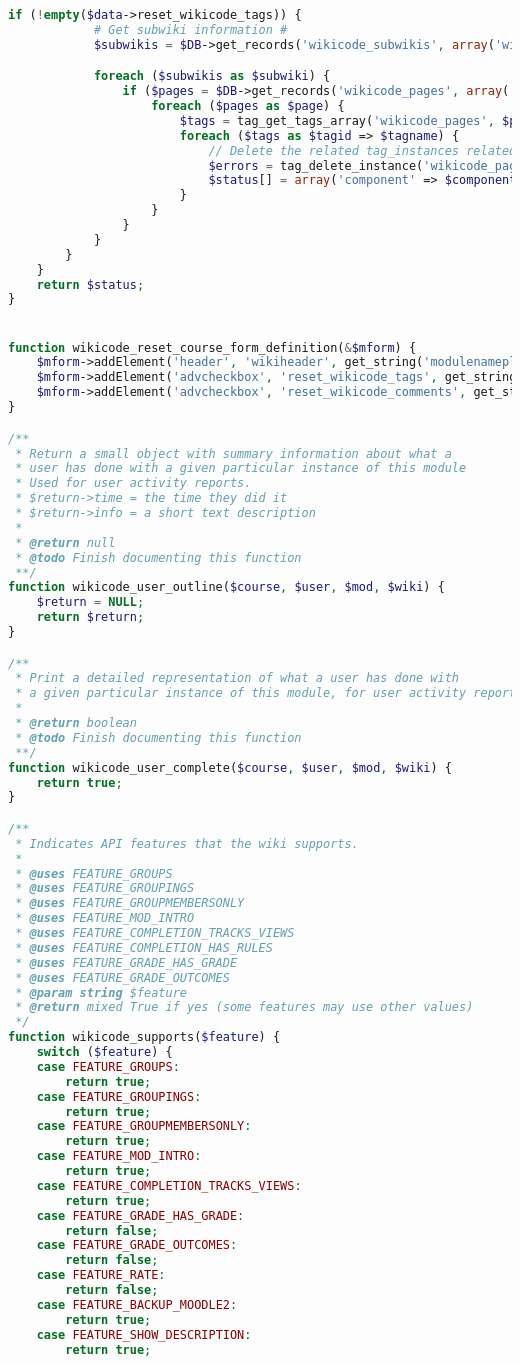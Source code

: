 \begin{lstlisting}[language=PHP]
        if (!empty($data->reset_wikicode_tags)) {
            # Get subwiki information #
            $subwikis = $DB->get_records('wikicode_subwikis', array('wikiid' => $wiki->id));

            foreach ($subwikis as $subwiki) {
                if ($pages = $DB->get_records('wikicode_pages', array('subwikiid' => $subwiki->id))) {
                    foreach ($pages as $page) {
                        $tags = tag_get_tags_array('wikicode_pages', $page->id);
                        foreach ($tags as $tagid => $tagname) {
                            // Delete the related tag_instances related to the wiki page.
                            $errors = tag_delete_instance('wikicode_pages', $page->id, $tagid);
                            $status[] = array('component' => $componentstr, 'item' => get_string('tagsdeleted', 'wikicode'), 'error' => $errors);
                        }
                    }
                }
            }
        }
    }
    return $status;
}


function wikicode_reset_course_form_definition(&$mform) {
    $mform->addElement('header', 'wikiheader', get_string('modulenameplural', 'wikicode'));
    $mform->addElement('advcheckbox', 'reset_wikicode_tags', get_string('removeallwikitags', 'wikicode'));
    $mform->addElement('advcheckbox', 'reset_wikicode_comments', get_string('deleteallcomments'));
}

/**
 * Return a small object with summary information about what a
 * user has done with a given particular instance of this module
 * Used for user activity reports.
 * $return->time = the time they did it
 * $return->info = a short text description
 *
 * @return null
 * @todo Finish documenting this function
 **/
function wikicode_user_outline($course, $user, $mod, $wiki) {
    $return = NULL;
    return $return;
}

/**
 * Print a detailed representation of what a user has done with
 * a given particular instance of this module, for user activity reports.
 *
 * @return boolean
 * @todo Finish documenting this function
 **/
function wikicode_user_complete($course, $user, $mod, $wiki) {
    return true;
}

/**
 * Indicates API features that the wiki supports.
 *
 * @uses FEATURE_GROUPS
 * @uses FEATURE_GROUPINGS
 * @uses FEATURE_GROUPMEMBERSONLY
 * @uses FEATURE_MOD_INTRO
 * @uses FEATURE_COMPLETION_TRACKS_VIEWS
 * @uses FEATURE_COMPLETION_HAS_RULES
 * @uses FEATURE_GRADE_HAS_GRADE
 * @uses FEATURE_GRADE_OUTCOMES
 * @param string $feature
 * @return mixed True if yes (some features may use other values)
 */
function wikicode_supports($feature) {
    switch ($feature) {
    case FEATURE_GROUPS:
        return true;
    case FEATURE_GROUPINGS:
        return true;
    case FEATURE_GROUPMEMBERSONLY:
        return true;
    case FEATURE_MOD_INTRO:
        return true;
    case FEATURE_COMPLETION_TRACKS_VIEWS:
        return true;
    case FEATURE_GRADE_HAS_GRADE:
        return false;
    case FEATURE_GRADE_OUTCOMES:
        return false;
    case FEATURE_RATE:
        return false;
    case FEATURE_BACKUP_MOODLE2:
        return true;
    case FEATURE_SHOW_DESCRIPTION:
        return true;


\end{lstlisting}
